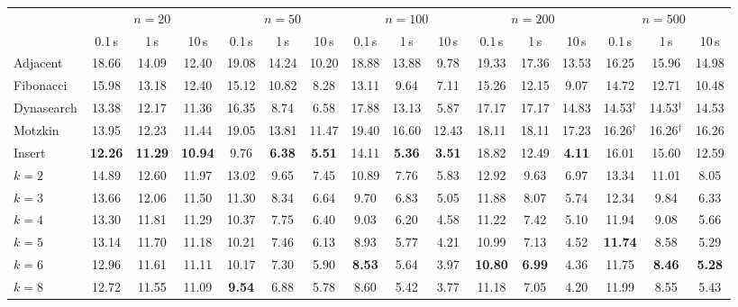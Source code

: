 \documentclass[letterpaper]{article} %
\theoremstyle{definition}
\begin{document}
\begin{table}[t]
\centering
\small
\setlength{\tabcolsep}{4pt}
\begin{tabular}{@{}l*{15}{c}@{}}
\toprule
 & \multicolumn{3}{c}{$n=20$} & \multicolumn{3}{c}{$n=50$}
 & \multicolumn{3}{c}{$n=100$} & \multicolumn{3}{c}{$n=200$}
 & \multicolumn{3}{c}{$n=500$} \\
\cmidrule(lr){2-4}\cmidrule(lr){5-7}\cmidrule(lr){8-10}\cmidrule(lr){11-13}\cmidrule(l){14-16}
 & 0.1\,s & 1\,s & 10\,s & 0.1\,s & 1\,s & 10\,s & 0.1\,s & 1\,s & 10\,s
 & 0.1\,s & 1\,s & 10\,s & 0.1\,s & 1\,s & 10\,s \\
\midrule
Adjacent & 18.66 & 14.09 & 12.40 & 19.08 & 14.24 & 10.20 & 18.88 & 13.88 & 9.78 & 19.33 & 17.36 & 13.53 & 16.25 & 15.96 & 14.98 \\
Fibonacci & 15.98 & 13.18 & 12.40 & 15.12 & 10.82 & 8.28 & 13.11 & 9.64 & 7.11 & 15.26 & 12.15 & 9.07 & 14.72 & 12.71 & 10.48 \\
Dynasearch & 13.38 & 12.17 & 11.36 & 16.35 & 8.74 & 6.58 & 17.88 & 13.13 & 5.87 & 17.17 & 17.17 & 14.83 & 14.53$^\dagger$ & 14.53$^\dagger$ & 14.53 \\
Motzkin & 13.95 & 12.23 & 11.44 & 19.05 & 13.81 & 11.47 & 19.40 & 16.60 & 12.43 & 18.11 & 18.11 & 17.23 & 16.26$^\dagger$ & 16.26$^\dagger$ & 16.26 \\
\midrule
Insert & \textbf{12.26} & \textbf{11.29} & \textbf{10.94} & 9.76 & \textbf{6.38} & \textbf{5.51} & 14.11 & \textbf{5.36} & \textbf{3.51} & 18.82 & 12.49 & \textbf{4.11} & 16.01 & 15.60 & 12.59 \\
\midrule
$k=2$ & 14.89 & 12.60 & 11.97 & 13.02 & 9.65 & 7.45 & 10.89 & 7.76 & 5.83 & 12.92 & 9.63 & 6.97 & 13.34 & 11.01 & 8.05 \\
$k=3$ & 13.66 & 12.06 & 11.50 & 11.30 & 8.34 & 6.64 & 9.70 & 6.83 & 5.05 & 11.88 & 8.07 & 5.74 & 12.34 & 9.84 & 6.33 \\
$k=4$ & 13.30 & 11.81 & 11.29 & 10.37 & 7.75 & 6.40 & 9.03 & 6.20 & 4.58 & 11.22 & 7.42 & 5.10 & 11.94 & 9.08 & 5.66 \\
$k=5$ & 13.14 & 11.70 & 11.18 & 10.21 & 7.46 & 6.13 & 8.93 & 5.77 & 4.21 & 10.99 & 7.13 & 4.52 & \textbf{11.74} & 8.58 & 5.29 \\
$k=6$ & 12.96 & 11.61 & 11.11 & 10.17 & 7.30 & 5.90 & \textbf{8.53} & 5.64 & 3.97 & \textbf{10.80} & \textbf{6.99} & 4.36 & 11.75 & \textbf{8.46} & \textbf{5.28} \\
$k=8$ & 12.72 & 11.55 & 11.09 & \textbf{9.54} & 6.88 & 5.78 & 8.60 & 5.42 & 3.77 & 11.18 & 7.05 & 4.20 & 11.99 & 8.55 & 5.43 \\

\end{tabular}
\end{table}
\end{document}
